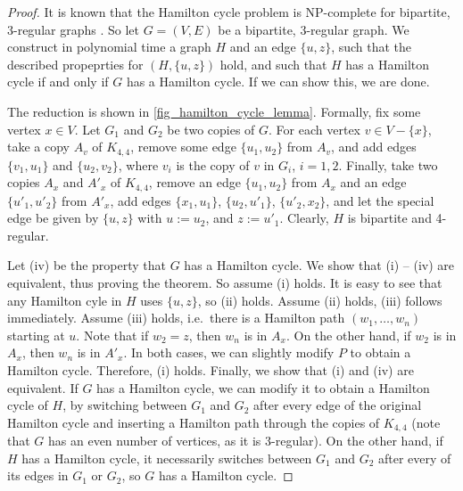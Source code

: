 \documentclass[runningheads]{llncs}
\newcommand{\set}[1]{\{ #1 \}}
\begin{document}
\begin{proof}
It is known that the Hamilton cycle problem is NP-complete for bipartite, 3-regular graphs \cite{hamilton3regularBip}. So let $G = (V, E)$ be a bipartite, 3-regular graph. We construct in polynomial time a graph $H$ and an edge $\set{u,z}$, such that the described propeprties for $(H, \set{u,z})$ hold, and such that $H$ has a Hamilton cycle if and only if $G$ has a Hamilton cycle. If we can show this, we are done.

The reduction is shown in \cref{fig_hamilton_cycle_lemma}. Formally, fix some vertex $x \in V$. Let $G_1$ and $G_2$ be two copies of $G$. For each vertex $v \in V-\set{x}$, take a copy $A_v$ of $K_{4,4}$, remove some edge $\set{u_1, u_2}$ from $A_v$, and add edges $\set{v_1,u_1}$ and $\set{u_2,v_2}$, where $v_i$ is the copy of $v$ in $G_i$, $i = 1,2$. Finally, take two copies $A_x$ and $A'_x$ of $K_{4,4}$, remove an edge $\set{u_1,u_2}$ from $A_x$ and an edge $\set{u'_1,u'_2}$ from $A'_x$, add edges $\set{x_1,u_1}$, $\set{u_2,u'_1}$, $\set{u'_2,x_2}$, and let the special edge be given by $\set{u, z}$ with $u := u_2$, and $z := u'_1$. Clearly, $H$ is bipartite and 4-regular.

Let (iv) be the property that $G$ has a Hamilton cycle. We show that (i) -- (iv) are equivalent, thus proving the theorem. So assume (i) holds. It is easy to see that any Hamilton cyle in $H$ uses $\set{u,z}$, so (ii) holds. Assume (ii) holds, (iii) follows immediately. Assume (iii) holds, i.e.\ there is a Hamilton path $(w_1, \dots, w_n)$ starting at $u$. Note that if $w_2 = z$, then $w_n$ is in $A_x$. On the other hand, if $w_2$ is in $A_x$, then $w_n$ is in $A'_x$. In both cases, we can slightly modify $P$ to obtain a Hamilton cycle. Therefore, (i) holds. Finally, we show that (i) and (iv) are equivalent. If $G$ has a Hamilton cycle, we can modify it to obtain a Hamilton cycle of $H$, by switching between $G_1$ and $G_2$ after every edge of the original Hamilton cycle and inserting a Hamilton path through the copies of $K_{4,4}$ (note that $G$ has an even number of vertices, as it is 3-regular). On the other hand, if $H$ has a Hamilton cycle, it necessarily switches between $G_1$ and $G_2$ after every of its edges in $G_1$ or $G_2$, so $G$ has a Hamilton cycle.
\end{proof}
\end{document}

